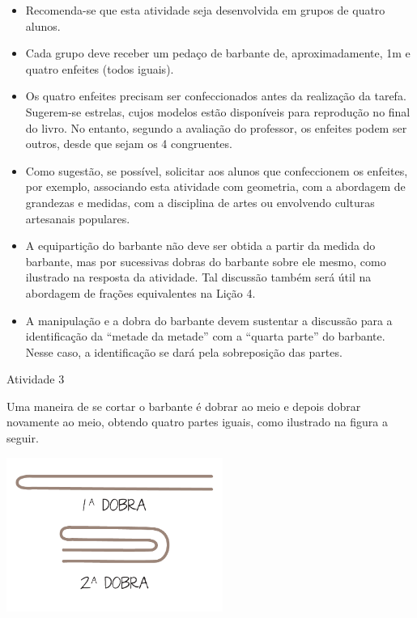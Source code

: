 \begin{multicols}{2}
\begin{itemize} %
    \item       Recomenda-se que esta atividade seja desenvolvida em grupos de quatro alunos.
    \item       Cada grupo deve receber um pedaço de barbante de, aproximadamente, 1m e quatro enfeites (todos iguais).
    \item       Os quatro enfeites precisam ser confeccionados antes da realização da tarefa. Sugerem-se estrelas, cujos modelos estão disponíveis para reprodução no final do livro. No entanto, segundo a avaliação do professor, os enfeites podem ser outros, desde que sejam os 4 congruentes.
    \item       Como sugestão, se possível, solicitar aos alunos que confeccionem os enfeites, por exemplo, associando esta atividade com geometria, com a abordagem de grandezas e medidas, com a disciplina de artes ou envolvendo culturas artesanais populares.
    \item       A equipartição do barbante não deve ser obtida a partir da medida do barbante, mas por sucessivas dobras do barbante sobre ele mesmo, como ilustrado na resposta da atividade. Tal discussão também  será útil na abordagem de frações equivalentes na Lição 4.
    \item       A manipulação e a dobra do barbante devem sustentar a discussão para a identificação da       ``metade da metade'' com a       ``quarta parte'' do barbante. Nesse caso, a identificação se dará pela sobreposição das partes.
\end{itemize} %

\vspace*{\fill}
\columnbreak

\begin{resposta*}{Atividade 3}

Uma maneira de se cortar o barbante é dobrar ao meio e depois dobrar novamente ao meio, obtendo quatro partes iguais, como ilustrado na figura a seguir.
  \begin{center}
  \includegraphics[width=200pt, keepaspectratio]{../figuras/licao01/ativ3_fig03.png}
  \end{center}
\end{resposta*}
\end{multicols}

